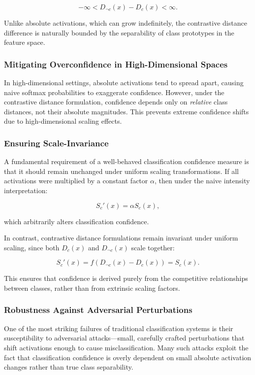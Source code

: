 \documentclass[12pt]{article}
\begin{document}
\[
-\infty < D_{\neg c}(x) - D_c(x) < \infty.
\]

Unlike absolute activations, which can grow indefinitely, the contrastive distance difference is naturally bounded by the separability of class prototypes in the feature space.

\subsubsection{Mitigating Overconfidence in High-Dimensional Spaces}

In high-dimensional settings, absolute activations tend to spread apart, causing naive softmax probabilities to exaggerate confidence. However, under the contrastive distance formulation, confidence depends only on \textit{relative} class distances, not their absolute magnitudes. This prevents extreme confidence shifts due to high-dimensional scaling effects.

\subsubsection{Ensuring Scale-Invariance}

A fundamental requirement of a well-behaved classification confidence measure is that it should remain unchanged under uniform scaling transformations. If all activations were multiplied by a constant factor \( \alpha \), then under the naive intensity interpretation:

\[
S_c'(x) = \alpha S_c(x),
\]

which arbitrarily alters classification confidence.

In contrast, contrastive distance formulations remain invariant under uniform scaling, since both \( D_c(x) \) and \( D_{\neg c}(x) \) scale together:

\[
S_c'(x) = f(D_{\neg c}(x) - D_c(x)) = S_c(x).
\]

This ensures that confidence is derived purely from the competitive relationships between classes, rather than from extrinsic scaling factors.

\subsubsection{Robustness Against Adversarial Perturbations}

One of the most striking failures of traditional classification systems is their susceptibility to adversarial attacks—small, carefully crafted perturbations that shift activations enough to cause misclassification. Many such attacks exploit the fact that classification confidence is overly dependent on small absolute activation changes rather than true class separability.
\end{document}

